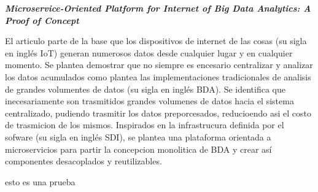 
\textbf{\emph{Microservice-Oriented Platform for Internet of Big
Data Analytics: A Proof of Concept}} \cite{li_microservice-oriented_2019} 
 
El articulo parte de la base que los dispositivos de internet de las cosas (su sigla en inglés IoT) generan numerosos datos desde cualquier lugar y en cualquier momento. Se plantea demostrar que no siempre es encesario centralizar y analizar los datos acumulados como plantea las implementaciones tradicionales de analisis de grandes volumentes de datos (su sigla en inglés BDA).
Se identifica que inecesariamente son trasmitidos grandes volumenes de datos hacia el sistema centralizado, pudiendo trasmitir los datos preporcesados, reducioendo asi el costo de trasmicion de los mismos. Inspirados en la infrastrucura definida por el sofware (su sigla en inglés SDI), se plantea una plataforma orientada a microservicios para partir la concepcion monolitica de BDA y crear así componentes desacoplados y reutilizables.


esto es una prueba 